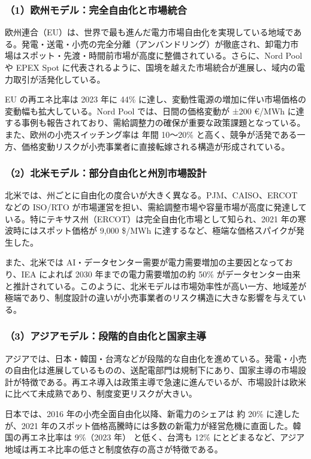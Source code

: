 \subsubsection{（1）欧州モデル：完全自由化と市場統合}

欧州連合（EU）は、世界で最も進んだ電力市場自由化を実現している地域である。発電・送電・小売の完全分離（アンバンドリング）が徹底され、卸電力市場はスポット・先渡・時間前市場が高度に整備されている。さらに、Nord Pool や EPEX Spot に代表されるように、国境を越えた市場統合が進展し、域内の電力取引が活発化している。

EU の再エネ比率は 2023 年に 44\% に達し、変動性電源の増加に伴い市場価格の変動幅も拡大している。Nord Pool では、日間の価格変動が ±200 €/MWh に達する事例も報告されており、需給調整力の確保が重要な政策課題となっている。また、欧州の小売スイッチング率は 年間 10〜20\% と高く、競争が活発である一方、価格変動リスクが小売事業者に直接転嫁される構造が形成されている。

\subsubsection{（2）北米モデル：部分自由化と州別市場設計}

北米では、州ごとに自由化の度合いが大きく異なる。PJM、CAISO、ERCOT などの ISO/RTO が市場運営を担い、需給調整市場や容量市場が高度に発達している。特にテキサス州（ERCOT）は完全自由化市場として知られ、2021 年の寒波時にはスポット価格が 9,000 \$/MWh に達するなど、極端な価格スパイクが発生した。

また、北米では AI・データセンター需要が電力需要増加の主要因となっており、IEA によれば 2030 年までの電力需要増加の約 50\% がデータセンター由来と推計されている。このように、北米モデルは市場効率性が高い一方、地域差が極端であり、制度設計の違いが小売事業者のリスク構造に大きな影響を与えている。

\subsubsection{（3）アジアモデル：段階的自由化と国家主導}

アジアでは、日本・韓国・台湾などが段階的な自由化を進めている。発電・小売の自由化は進展しているものの、送配電部門は規制下にあり、国家主導の市場設計が特徴である。再エネ導入は政策主導で急速に進んでいるが、市場設計は欧米に比べて未成熟であり、制度変更リスクが大きい。

日本では、2016 年の小売全面自由化以降、新電力のシェアは 約 20\% に達したが、2021 年のスポット価格高騰時には多数の新電力が経営危機に直面した。韓国の再エネ比率は 9\%（2023 年） と低く、台湾も 12\% にとどまるなど、アジア地域は再エネ比率の低さと制度依存の高さが特徴である。

